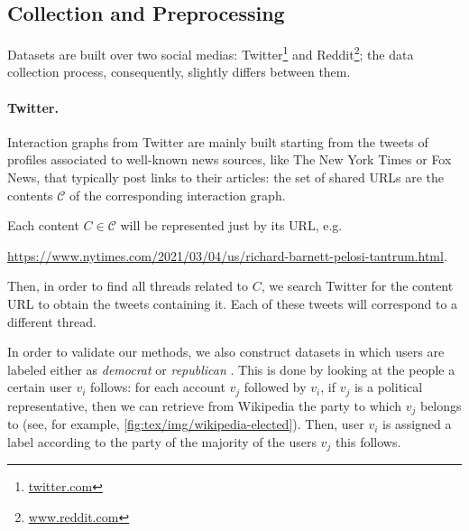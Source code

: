 \subsection{Collection and Preprocessing}%
\label{sub:collection_and_preprocessing}

Datasets are built over two social medias:
Twitter\footnote{\url{twitter.com}} and Reddit\footnote{\url{www.reddit.com}}; the data
collection process, consequently, slightly differs between them.

\paragraph{Twitter.}%
\label{par:twitter-data}

Interaction graphs from Twitter are mainly built starting from the tweets
of profiles associated to well-known news sources, like The
New York Times or Fox News, that typically post links to their articles:
the set of shared URLs are the contents $\mathcal{C} $ of the corresponding interaction graph.


Each content $C \in \mathcal{C}$ will be represented just by its URL,
e.g.

	{\footnotesize
		\begin{center}
			\url{https://www.nytimes.com/2021/03/04/us/richard-barnett-pelosi-tantrum.html}.
		\end{center}
	}

Then, in order to find all threads related to $C$, we search Twitter for
the content URL to obtain the tweets containing it. Each of these tweets
will correspond to a different thread.

\medskip

In order to validate our methods, we also construct datasets in which users are labeled either as
\emph{democrat} or \emph{republican} \footnotemark. This is done by looking at the people a
certain user $v_i$ follows: for each account $v_j$ followed by $v_i$, if $v_j$ is a political representative, then we can
retrieve from Wikipedia the party to which $v_j$ belongs to (see, for
example, \autoref{fig:tex/img/wikipedia-elected}). Then, user $v_i$ is assigned a
label according to the party of the majority of the users $v_j$ this
follows.

